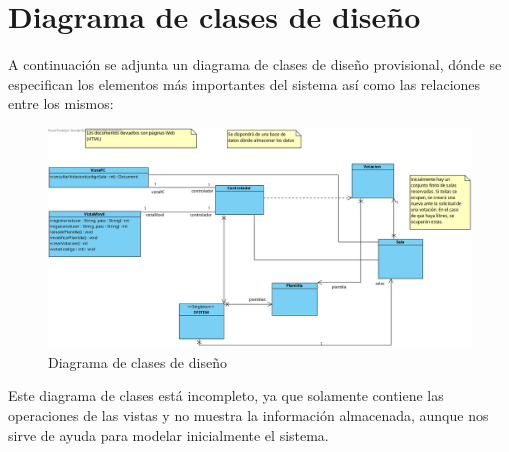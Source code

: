 \documentclass{article}
\begin{document}
\section{Diagrama de clases de diseño}
A continuación se adjunta un diagrama de clases de diseño provisional, dónde se especifican los elementos más importantes del sistema así como las relaciones entre los mismos:

\begin{figure}[H]
	\centering
	\includegraphics[totalheight=9.25cm]{img/diagrama_clases}
	\caption{Diagrama de clases de diseño}
	\label{fig:figura1}
\end{figure}

Este diagrama de clases está incompleto, ya que solamente contiene las operaciones de las vistas y no muestra la información almacenada, aunque nos sirve de ayuda para modelar inicialmente el sistema.
\end{document}
